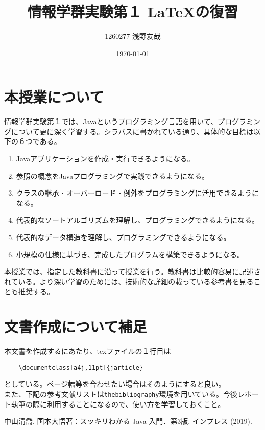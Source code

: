 \documentclass[a4j,11pt]{jarticle}
\title{情報学群実験第１ \LaTeX の復習}
\author{1260277 浅野友哉}
\date{\today}
\begin{document}
\maketitle

\section{本授業について}

情報学群実験第１では、Javaというプログラミング言語を用いて、プログラミングについて更に深く学習する。シラバスに書かれている通り、具体的な目標は以下の６つである。
\begin{enumerate}
    \item Javaアプリケーションを作成・実行できるようになる。
    \item 参照の概念をJavaプログラミングで実践できるようになる。
    \item クラスの継承・オーバーロード・例外をプログラミングに活用できるようになる。
    \item 代表的なソートアルゴリズムを理解し、プログラミングできるようになる。
    \item 代表的なデータ構造を理解し、プログラミングできるようになる。
    \item 小規模の仕様に基づき、完成したプログラムを構築できるようになる。
\end{enumerate}
\indent 本授業では、指定した教科書\cite{simplejava}に沿って授業を行う。教科書は比較的容易に記述されている。より深い学習のためには、技術的な詳細の載っている参考書を見ることも推奨する。

\section{文書作成について補足}
本文書を作成するにあたり、texファイルの１行目は
\begin{verbatim}
    \documentclass[a4j,11pt]{jarticle}
\end{verbatim}
としている。ページ幅等を合わせたい場合はそのようにすると良い。\\
\indent また、下記の参考文献リストは\verb|thebibliography|環境を用いている。今後レポート執筆の際に利用することになるので、使い方を学習しておくこと。



\begin{thebibliography}{99}
 中山清喬, 国本大悟著：スッキリわかる Java 入門．第3版, インプレス (2019).

\end{thebibliography}
\end{document}
